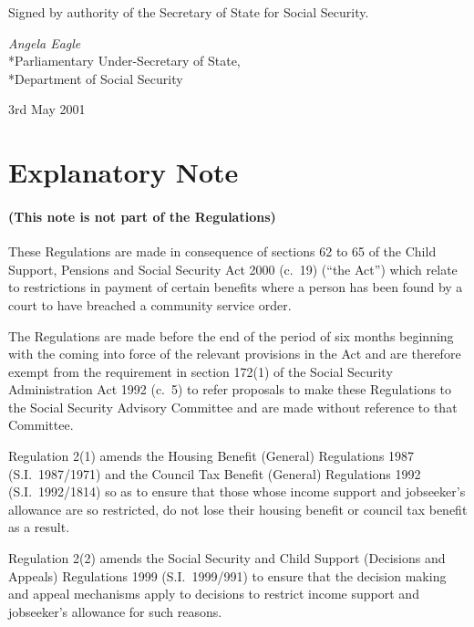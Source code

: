 \documentclass[12pt,a4paper]{article}
\begin{document}
\bigskip

Signed 
by authority of the Secretary of State for Social Security.

{\raggedleft
\emph{Angela Eagle}\\*Parliamentary Under-Secretary of State,\\*Department of Social Security

}


3rd May 2001

\small

\part{Explanatory Note}

\renewcommand\parthead{— Explanatory Note}

\subsection*{(This note is not part of the Regulations)}

These Regulations are made in consequence of sections 62 to 65 of the Child Support, Pensions and Social Security Act 2000 (c.\ 19) (“the Act”) which relate to restrictions in payment of certain benefits where a person has been found by a court to have breached a community service order.

The Regulations are made before the end of the period of six months beginning with the coming into force of the relevant provisions in the Act and are therefore exempt from the requirement in section 172(1) of the Social Security Administration Act 1992 (c.\ 5) to refer proposals to make these Regulations to the Social Security Advisory Committee and are made without reference to that Committee.

Regulation 2(1) amends the Housing Benefit (General) Regulations 1987 (S.I.\ 1987/1971) and the Council Tax Benefit (General) Regulations 1992 (S.I.\ 1992/1814) so as to ensure that those whose income support and jobseeker’s allowance are so restricted, do not lose their housing benefit or council tax benefit as a result.

Regulation 2(2) amends the Social Security and Child Support (Decisions and Appeals) Regulations 1999 (S.I.\ 1999/991) to ensure that the decision making and appeal mechanisms apply to decisions to restrict income support and jobseeker’s allowance for such reasons.
\end{document}
